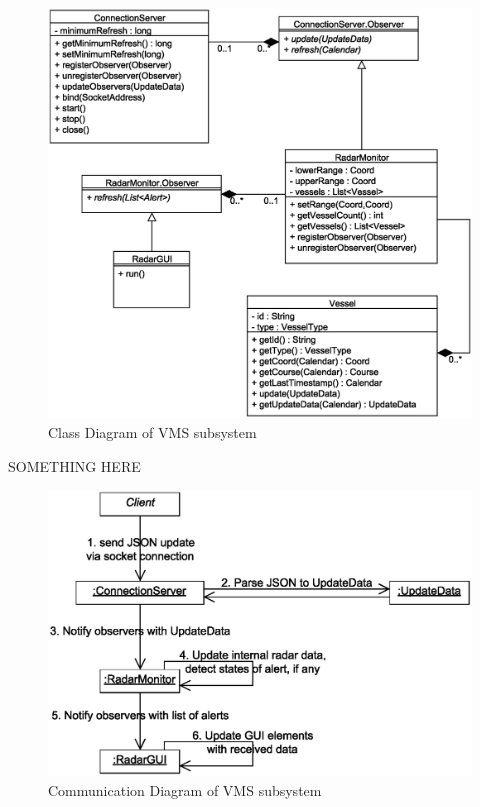 \documentclass{article}
\begin{document}
\begin{figure}[!htb]	
\caption{Class Diagram of VMS subsystem}
\centering
\includegraphics[scale=0.3]{diagrams/vms-class-diagram.eps}
\end{figure}

SOMETHING HERE

\break

\begin{figure}[!htb]
\caption{Communication Diagram of VMS subsystem}
\centering
\includegraphics[scale=0.3]{diagrams/vms-communication-diagram.eps}
\end{figure}
\end{document}
